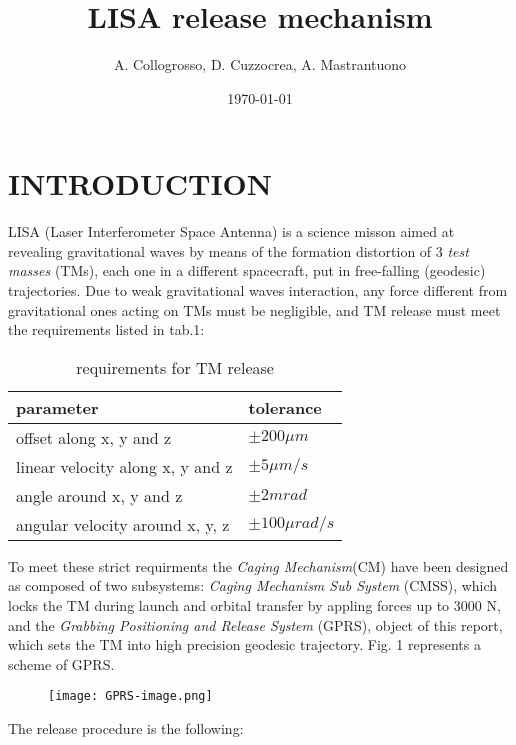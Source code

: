 \documentclass[11pt,twocolumn]{article}
\begin{document}
\title{LISA release mechanism}
\author{A. Collogrosso, D. Cuzzocrea, A. Mastrantuono}
\date{\today}
\maketitle

\section{INTRODUCTION}
LISA (Laser Interferometer Space Antenna) is a science misson aimed at revealing gravitational waves by means of the formation distortion of 3 \textit{test masses} (TMs), each one in a different spacecraft, put in free-falling (geodesic) trajectories. Due to weak gravitational waves interaction, any force different from gravitational ones acting on TMs must be negligible, and TM release must meet the requirements listed in tab.1:

\begin{table}[h]
\caption{requirements for TM release}
\begin{tabular}{l|l} \hline
parameter & tolerance \\ \hline
offset along x, y and z & $\pm 200 \mu m$\\
linear velocity along x, y and z & $\pm 5 \mu m/s$\\
angle around x, y and z & $\pm 2 mrad$\\
angular velocity around x, y, z& $\pm 100 \mu rad/s$\\ 
\end{tabular}
\end{table}

To meet these strict requirments the \textit{Caging Mechanism}(CM) have been designed as composed of two subsystems: \textit{Caging Mechanism Sub System} (CMSS), which locks the TM during launch and orbital transfer by appling forces up to 3000 N, and the \textit{Grabbing Positioning and Release System} (GPRS), object of this report, which sets the TM into high precision geodesic trajectory. Fig. 1 represents a scheme of GPRS. 

\begin{figure}[h]
\texttt{[image: GPRS-image.png]}
\end{figure}

The release procedure is the following:
\end{document}
